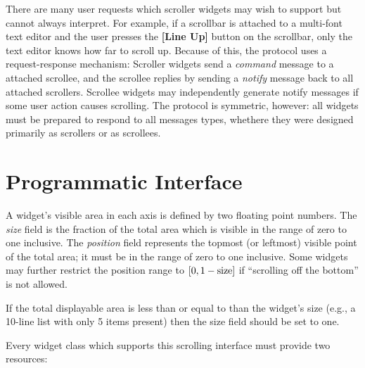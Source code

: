 There are many user requests which scroller widgets may wish to support
but cannot always interpret.  For example, if a scrollbar is attached to
a multi-font text editor and the user presses the {\bf [Line Up]}
button on the scrollbar, only the text editor knows how far to
scroll up.  Because of this, the protocol uses a request-response
mechanism: Scroller widgets send a {\it command}\/ message to a attached
scrollee, and the scrollee replies by sending a {\it notify}\/ message back
to all attached scrollers.  Scrollee widgets may independently
generate notify messages if some user action causes scrolling.  The
protocol is symmetric, however: all widgets must be prepared to
respond to all messages types, whethere they were designed primarily
as scrollers or as scrollees.


\section{Programmatic Interface}

A widget's visible area in each axis is defined by two floating point
numbers.  The {\it size}\/ field is the fraction of the total area which is
visible in the range of zero to one inclusive.  The {\it position}\/ field
represents the topmost (or leftmost) visible point of the total area;
it must be in the range of zero to one inclusive.  Some widgets may
further restrict the position range to $[0, 1-{\rm{size}}]$ if ``scrolling off
the bottom'' is not allowed.

If the total displayable area is less than or equal to than the
widget's size (e.g., a 10-line list with only 5 items present) then
the size field should be set to one.

Every widget class which supports this scrolling interface must
provide two resources:

